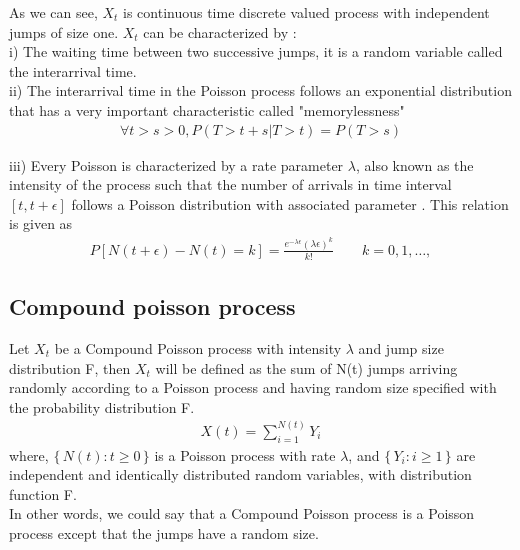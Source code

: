 \documentclass[12pt]{report}
\begin{document}
As we can see, $X_t$ is continuous time discrete valued process with independent jumps of size one. $X_t$ can be characterized by :\\

i) The waiting time between two successive jumps, it is a random variable called the interarrival time. \\
ii) The interarrival time in the Poisson process follows an exponential distribution that has a very important characteristic called "memorylessness" 
\begin{gather}
 \forall t > s > 0, P(T > t + s|T > t) = P(T > s)
\end{gather}

iii) Every Poisson is characterized by a rate parameter $\lambda$, also known as the intensity of the process such that the number of arrivals in time interval $[t, t + \epsilon]$ follows a Poisson distribution with associated parameter \jcor{$\lambda \tau$}{$\lambda \epsilon$} . This relation is given as
\begin{gather}
 P [N(t+ \epsilon) - N(t) = k] = \frac{e^{-\lambda \epsilon} (\lambda \epsilon)^k}{k!}  \qquad k= 0,1,\ldots,
\label{foo}
\end{gather} 
 
\subsection{Compound poisson process}
Let $X_t$ be a Compound Poisson process with intensity $\lambda$ and jump size distribution F, then $X_t$ will be defined as the sum of N(t) jumps arriving randomly according to a Poisson process and having random size specified with the probability distribution F.
\begin{gather}
X(t) = \sum_{i=1}^{N(t)} Y_i
\end{gather}
where,  $\{\,N(t) : t \geq 0\,\}$ is a Poisson process with rate $\lambda$, and $ \{\,Y_i : i \geq 1\,\}$ are independent and identically distributed random variables, with distribution function F.\\
In other words, we could say that a Compound Poisson process is a Poisson process except that the jumps have a random size.
\end{document}
